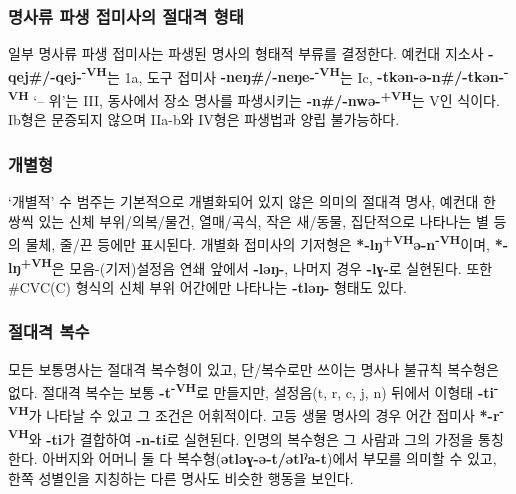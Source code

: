 \subsubsection{명사류 파생 접미사의 절대격 형태}
일부 명사류 파생 접미사는 파생된 명사의 형태적 부류를 결정한다. 예컨대 지소사 \textbf{-qej\#/-qej-\textsuperscript{-VH}}는 1a, 도구 접미사 \textbf{-neŋ\#/-neŋe-\textsuperscript{-VH}}는 Ic, \textbf{-tkən-ə-n\#/-tkən-\textsuperscript{-VH}} `-- 위'는 III, 동사에서 장소 명사를 파생시키는 \textbf{-n\#/-nwə-\textsuperscript{+VH}}는 V인 식이다. Ib형은 문증되지 않으며 IIa-b와 IV형은 파생법과 양립 불가능하다.
\subsubsection{개별형}
`개별적' 수 범주는 기본적으로 개별화되어 있지 않은 의미의 절대격 명사, 예컨대 한 쌍씩 있는 신체 부위/의복/물건, 열매/곡식, 작은 새/동물, 집단적으로 나타나는 별 등의 물체, 줄/끈 등에만 표시된다. 개별화 접미사의 기저형은 \textbf{*-lŋ\textsuperscript{+VH}ə-n\textsuperscript{-VH}}이며, \textbf{*-lŋ\textsuperscript{+VH}}은 모음-(기저)설정음 연쇄 앞에서 \textbf{-ləŋ-}, 나머지 경우 \textbf{-lɣ-}로 실현된다. 또한 \#CVC(C) 형식의 신체 부위 어간에만 나타나는 \textbf{-tləŋ-} 형태도 있다.
\subsubsection{절대격 복수}
모든 보통명사는 절대격 복수형이 있고, 단/복수로만 쓰이는 명사나 불규칙 복수형은 없다. 절대격 복수는 보통 \textbf{-t\textsuperscript{-VH}}로 만들지만, 설정음(t, r, c, j, n) 뒤에서 이형태 \textbf{-ti\textsuperscript{-VH}}가 나타날 수 있고 그 조건은 어휘적이다. 고등 생물 명사의 경우 어간 접미사 \textbf{*-r\textsuperscript{-VH}}와 \textbf{-ti}가 결합하여 \textbf{-n-ti}로 실현된다. 인명의 복수형은 그 사람과 그의 가정을 통칭한다. 아버지와 어머니 둘 다 복수형(\textbf{ətləɣ-ə-t/ətlˀa-t})에서 부모를 의미할 수 있고, 한쪽 성별인을 지칭하는 다른 명사도 비슷한 행동을 보인다. 
